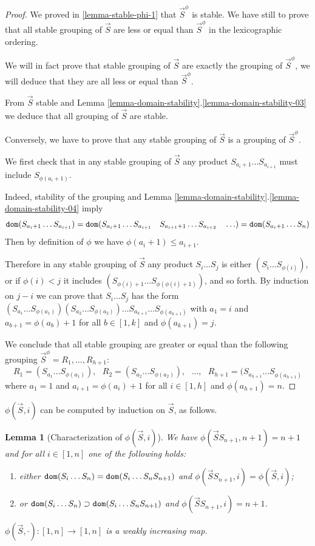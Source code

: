\documentclass{lmcs}
\newtheorem{lemma}[theorem]{Lemma}
\begin{document}
\begin{proof}
We proved in \ref{lemma-stable-phi-1} that $\vec{S}^\phi$ is stable. We have still to
prove that all stable grouping of $\vec{S}$ 
are less or equal than $\vec{S}^\phi$ in the lexicographic ordering.

We will in fact prove that stable grouping of $\vec{S}$ are exactly the grouping of 
$\vec{S}^\phi$, we will deduce that they are all less or equal than $\vec{S}^\phi$.

From $\vec{S}$ stable and 
Lemma \ref{lemma-domain-stability}.\ref{lemma-domain-stability-03} 
we deduce that all grouping of $\vec{S}$ are stable.

Conversely, we have to prove that any stable grouping of $\vec{S}$  is a grouping
of $\vec{S}^\phi$.

We first check that in any stable grouping of $\vec{S}$ any 
product $S_{a_i+1} \ldots S_{a_{i+1}}$  must include $S_{\phi(a_i+1)}$.

Indeed, stability of the grouping and 
Lemma \ref{lemma-domain-stability}.\ref{lemma-domain-stability-04} 
imply
$$
{\tt dom}(S_{a_i+1} \ldots S_{a_{i+1}}) = 
{\tt dom}(S_{a_i+1} \ldots S_{a_{i+1}} \ \ \ S_{a_{i+1}+1} \ldots S_{a_{i+2}} \ \ \ \ldots) =
{\tt dom}(S_{a_i+1} \ldots S_n)
$$ 
Then by definition of $\phi$ we have $\phi(a_i+1) \le a_{i+1} $.

Therefore in any stable grouping of $\vec{S}$
any product $S_i \ldots S_j$ is either $(S_{i}\ldots 
S_{\phi(i)})$, or if $\phi(i) < j$ it includes $(S_{\phi(i)+1}\ldots S_{\phi(\phi(i)+1)})$,
and so forth. By induction on $j-i$ we can prove that $S_i \ldots S_j$ has the form
$(S_{a_1}\ldots S_{\phi(a_1)}) (S_{a_2}\ldots S_{\phi(a_2)})
\ldots S_{a_{k+1}}\ldots S_{\phi(a_{k+1})}$ with $a_1=i$ and $a_{b+1} = \phi(a_b)+1$ 
for all $b \in [1,k]$ and $\phi(a_{k+1}) = j$. 


We conclude that all stable grouping are greater or equal than the following grouping 
$\vec{S}^\phi =R_1, \ldots, R_{h+1}$: 
$$
R_1 = (S_{a_1}\ldots S_{\phi(a_1)}), \ \ \ 
R_2 = (S_{a_2}\ldots S_{\phi(a_2)}), \ \ \ 
\ldots, \ \ \ 
R_{h+1} = (S_{a_{h+1}}\ldots S_{\phi(a_{h+1})}
$$ 
where $a_1=1$ and $a_{i+1} = \phi(a_i)+1$ 
for all $i \in [1,h]$ and $\phi(a_{h+1}) = n$. 
\end{proof}

$\phi(\vec{S},i)$ can be computed by induction on $\vec{S}$, as follows. 

\begin{lemma}[Characterization of $\phi(\vec{S},i)$]
\label{lemma-phi-characterization}
We have $\phi(\vec{S} S_{n+1}, n+1) = n+1$ and for all $i \in [1,n]$
one of the following holds:
\begin{enumerate}
\item
either ${\tt dom}(S_i \ldots S_n) = {\tt dom}(S_i \ldots S_n S_{n+1})$
and $\phi(\vec{S}S_{n+1},i) = \phi(\vec{S},i)$;
\item
or ${\tt dom}(S_i \ldots S_n) \supset {\tt dom}(S_i \ldots S_n S_{n+1})$
and $\phi(\vec{S}S_{n+1},i) = n+1$.
\end{enumerate}
$\phi(\vec{S},\cdot):[1,n] \rightarrow [1,n]$ is a weakly increasing map.
\end{lemma}
\end{document}
